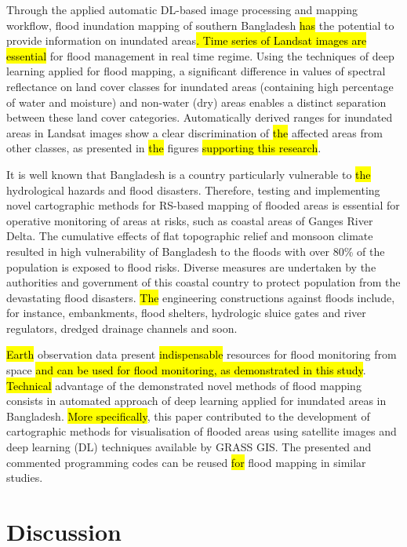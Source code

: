 \documentclass[water,article,submit,pdftex,moreauthors]{Definitions/mdpi}
\begin{document}
Through the applied automatic DL-based image processing and mapping workflow, flood inundation mapping of southern Bangladesh \hl{has} the potential to provide information on inundated areas\hl{. Time series of Landsat images are essential }for flood management in real time regime. Using the techniques of deep learning applied for flood mapping, a significant difference in values of spectral reflectance on land cover classes for inundated areas (containing high percentage of water and moisture) and non-water (dry) areas enables a distinct separation between these land cover categories. Automatically derived ranges for inundated areas in Landsat images show a clear discrimination of \hl{the} affected areas from other classes, as presented in \hl{the }figures \hl{supporting this research}. 

It is well known that Bangladesh is a country particularly vulnerable to \hl{the} hydrological hazards and flood disasters. Therefore, testing and implementing novel cartographic methods for RS-based mapping of flooded areas is essential for operative monitoring of areas at risks, such as coastal areas of Ganges River Delta. The cumulative effects of flat topographic relief and monsoon climate resulted in high vulnerability of Bangladesh to the floods with over 80\% of the population is exposed to flood risks. Diverse measures are undertaken by the authorities and government of this coastal country to protect population from the devastating flood disasters. \hl{The} engineering constructions against floods include, for instance, embankments, flood shelters, hydrologic sluice gates and river regulators, dredged drainage channels and soon. 

\hl{Earth} observation data present\hl{ indispensable} resources for flood monitoring from space \hl{and can be used for flood monitoring, as demonstrated in this study}. \hl{Technical} advantage of the demonstrated novel methods of flood mapping consists in automated approach of deep learning applied for inundated areas in Bangladesh. \hl{More specifically}, this paper contributed to the development of cartographic methods for visualisation of flooded areas using satellite images and deep learning (DL) techniques available by GRASS GIS. The presented and commented programming codes can be reused \hl{for} flood mapping in similar studies. 

\section{Discussion}
\end{document}
